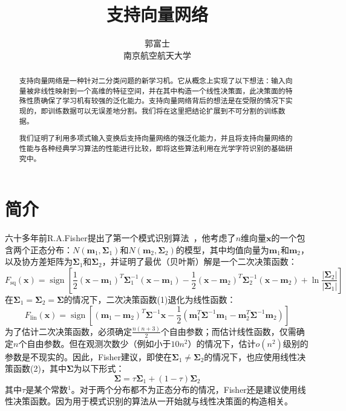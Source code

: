 \documentclass[lang=cn,11pt,a4paper]{elegantpaper}
\title{支持向量网络}
\author{郭富士 \\ 南京航空航天大学}
\institute{}
\date{\zhtoday}
\newcommand{\upcite}[1]{\textsuperscript{\textsuperscript{\cite{#1}}}}
\begin{document}
	\maketitle

	\begin{abstract}
	支持向量网络是一种针对二分类问题的新学习机。它从概念上实现了以下想法：输入向量被非线性映射到一个高维的特征空间，并在其中构造一个线性决策面，此决策面的特殊性质确保了学习机有较强的泛化能力。支持向量网络背后的想法是在受限的情况下实现的，即训练数据可以无误差地分割。我们将在这里把结论扩展到不可分割的训练数据。

	我们证明了利用多项式输入变换后支持向量网络的强泛化能力，并且将支持向量网络的性能与各种经典学习算法的性能进行比较，即将这些算法利用在光学字符识别的基础研究中。
	\end{abstract}

	\section{简介}
	六十多年前R.A.Fisher提出了第一个模式识别算法~\upcite{fisher1936use}，他考虑了$n$维向量$\mathbf{x}$的一个包含两个正态分布：$N(\mathbf{m}_1,\mathbf{\Sigma}_1)$和$N(\mathbf{m}_2,\mathbf{\Sigma}_2)$的模型，其中均值向量为$\mathbf{m}_1$和$\mathbf{m}_2$，以及协方差矩阵为$\mathbf{\Sigma}_1$和$\mathbf{\Sigma}_2$，并证明了最优（贝叶斯）解是一个二次决策函数：
	\begin{equation}
		F_{\mathrm{sq}}(\mathbf{x})=\operatorname{sign}\left[\frac{1}{2}\left(\mathbf{x}-\mathbf{m}_{1}\right)^{T} \mathbf{\Sigma}_{1}^{-1}\left(\mathbf{x}-\mathbf{m}_{1}\right)-\frac{1}{2}\left(\mathbf{x}-\mathbf{m}_{2}\right)^{T} \mathbf{\Sigma}_{2}^{-1}\left(\mathbf{x}-\mathbf{m}_{2}\right)+\ln \frac{\left|\mathbf{\Sigma}_{2}\right|}{\left|\mathbf{\Sigma}_{1}\right|}\right]\tag{1}
	\end{equation}
	在$\mathbf{\Sigma}_{1}=\mathbf{\Sigma}_{2}=\mathbf{\Sigma}$的情况下，二次决策函数(1)退化为线性函数：
	\begin{equation}
		F_{\mathrm{lin}}(\mathbf{x})=\operatorname{sign}\left[\left(\mathbf{m}_{1}-\mathbf{m}_{2}\right)^{T} \mathbf{\Sigma}^{-1} \mathbf{x}-\frac{1}{2}\left(\mathbf{m}_{1}^{T} \mathbf{\Sigma}^{-1} \mathbf{m}_{1}-\mathbf{m}_{2}^{T} \mathbf{\Sigma}^{-1} \mathbf{m}_{2}\right)\right]\tag{2}
	\end{equation}
	为了估计二次决策函数，必须确定$\frac{n(n+3)}{2}$个自由参数；而估计线性函数，仅需确定$n$个自由参数。但在观测次数少（例如小于$10n^2$）的情况下，估计$o(n^2)$级别的参数是不现实的。因此，Fisher建议，即使在$\mathbf{\Sigma}_1\neq\mathbf{\Sigma}_2$的情况下，也应使用线性决策函数(2)，其中$\mathbf{\Sigma}$为以下形式：
	\begin{equation}
		\mathbf{\Sigma}=\tau\mathbf{\Sigma}_1+(1-\tau)\mathbf{\Sigma}_2\tag{3}
	\end{equation}
	其中$\tau$是某个常数$^1$。对于两个分布都不为正态分布的情况，Fisher还是建议使用线性决策函数。因为用于模式识别的算法从一开始就与线性决策面的构造相关。
\end{document}
